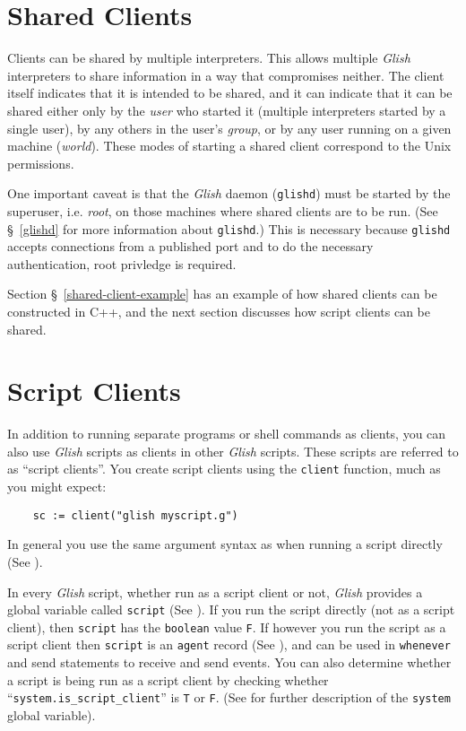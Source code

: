 \section{Shared Clients}
\label{shared-clients}

Clients can be shared by multiple interpreters. This allows multiple
{\em Glish} interpreters to share information in a way that compromises
neither. The client itself indicates that it is intended to be
shared, and it can indicate that it can be shared either only
by the {\em user} who started it (multiple interpreters started
by a single user), by any others in the user's {\em group}, or by any
user running on a given machine ({\em world}). These modes of starting
a shared client correspond to the {\sc Unix} permissions.

One important caveat is that the {\em Glish} daemon ({\tt glishd}) must be
started by the superuser, i.e. {\em root}, on those machines where shared
clients are to be run. (See \S~\ref{glishd} for more
information about {\tt glishd}.)  This is necessary because {\tt glishd}
accepts connections from a published port and to do the necessary
authentication, root privledge is required.

Section \S~\ref{shared-client-example} has an example of how shared clients
can be constructed in C++, and the next section discusses how script clients
can be shared.


\section{Script Clients}
\label{client-scripts}

In addition to running separate programs or shell commands as clients,
you can also use {\em Glish} scripts as clients in other {\em Glish}
scripts.  These
scripts are referred to as ``script clients''.  You create script clients
using the {\tt client} function, much as you might expect:
\begin{verbatim}
    sc := client("glish myscript.g")
\end{verbatim}
In general you use the same argument syntax as when running a script
directly (See ).

In every {\em Glish} script, whether run as a script client or not,
{\em Glish} provides
a global variable called {\tt script} (See ).  If you run
the script directly (not as a script client), then {\tt script} has
the {\tt boolean} value {\tt F}.  If however you run the script as a
script client then {\tt script} is an {\tt agent} record (See ),
and can be used in {\tt whenever} and send statements to receive
and send events.  You can also determine whether a script is being run
as a script client by checking whether ``{\tt system.is\_script\_client}'' is
{\tt T} or {\tt F}. (See  for further description of the
{\tt system} global variable).

